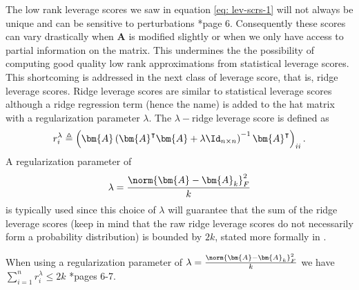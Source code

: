 The low rank leverage scores we saw in equation \ref{eq: lev-scrs-1} will not always be unique and can be sensitive to perturbations \cite{DBLP:journals/corr/CohenMM15}*{page 6}. Consequently these scores can vary drastically when $\bm{A}$ is modified slightly or when we only have access to partial information on the matrix. This undermines the the possibility of computing good quality low rank approximations from statistical leverage scores. This shortcoming is addressed in the next class of leverage score, that is, ridge leverage scores. Ridge leverage scores are similar to statistical leverage scores although a ridge regression term (hence the name) is added to the hat matrix with a regularization parameter $\lambda$. The $\lambda-$ridge leverage score is defined as
\begin{equation*}
    r_{i}^{\lambda} \triangleq \left( \bm{A} \left( \bm{A}^{\intercal} \bm{A} + \lambda \Id_{n \times n} \right)^{-1} \bm{A}^{\intercal} \right)_{ii}.
\end{equation*}
A regularization parameter of
\begin{equation*} \label{eq: rid-lev-reg-param}
    \lambda = \frac{\norm{\bm{A} - \bm{A}_k}_F^{2}}{k}
\end{equation*}
is typically used since this choice of $\lambda$ will guarantee that the sum of the ridge leverage scores (keep in mind that the raw ridge leverage scores do not necessarily form a probability distribution) is bounded by $2k$, stated more formally in .
\begin{lem} \label{lem: rid-lev-reg-param-bound}
    When using a regularization parameter of $\lambda = \frac{\norm{\bm{A} - \bm{A}_k}_F^{2}}{k}$ we have $\sum_{i=1}^{n} r_{i}^{\lambda} \leq 2k$ \cite{DBLP:journals/corr/CohenMM15}*{pages 6-7}.
\end{lem}
